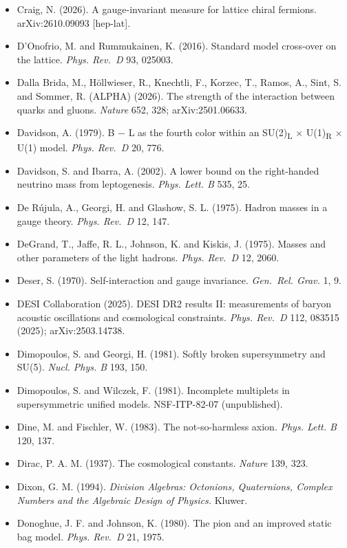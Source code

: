 \documentclass[
  11pt,
]{article}
\begin{document}
\begin{itemize}
\item
  Craig, N. (2026). A gauge-invariant measure for lattice chiral fermions. arXiv:2610.09093 {[}hep-lat{]}.
\item
  D'Onofrio, M. and Rummukainen, K. (2016). Standard model cross-over on the lattice. \emph{Phys. Rev.~D} 93, 025003.
\item
  Dalla Brida, M., Höllwieser, R., Knechtli, F., Korzec, T., Ramos, A., Sint, S. and Sommer, R. (ALPHA) (2026). The strength of the interaction between quarks and gluons. \emph{Nature} 652, 328; arXiv:2501.06633.
\item
  Davidson, A. (1979). B \ensuremath{-} L as the fourth color within an SU(2)\textsubscript{L} \ensuremath{\times} U(1)\textsubscript{R} \ensuremath{\times} U(1) model. \emph{Phys. Rev.~D} 20, 776.
\item
  Davidson, S. and Ibarra, A. (2002). A lower bound on the right-handed neutrino mass from leptogenesis. \emph{Phys. Lett. B} 535, 25.
\item
  De Rújula, A., Georgi, H. and Glashow, S. L. (1975). Hadron masses in a gauge theory. \emph{Phys. Rev.~D} 12, 147.
\item
  DeGrand, T., Jaffe, R. L., Johnson, K. and Kiskis, J. (1975). Masses and other parameters of the light hadrons. \emph{Phys. Rev.~D} 12, 2060.
\item
  Deser, S. (1970). Self-interaction and gauge invariance. \emph{Gen.~Rel. Grav.} 1, 9.
\item
  DESI Collaboration (2025). DESI DR2 results II: measurements of baryon acoustic oscillations and cosmological constraints. \emph{Phys. Rev.~D} 112, 083515 (2025); arXiv:2503.14738.
\item
  Dimopoulos, S. and Georgi, H. (1981). Softly broken supersymmetry and SU(5). \emph{Nucl. Phys. B} 193, 150.
\item
  Dimopoulos, S. and Wilczek, F. (1981). Incomplete multiplets in supersymmetric unified models. NSF-ITP-82-07 (unpublished).
\item
  Dine, M. and Fischler, W. (1983). The not-so-harmless axion. \emph{Phys. Lett. B} 120, 137.
\item
  Dirac, P. A. M. (1937). The cosmological constants. \emph{Nature} 139, 323.
\item
  Dixon, G. M. (1994). \emph{Division Algebras: Octonions, Quaternions, Complex Numbers and the Algebraic Design of Physics.} Kluwer.
\item
  Donoghue, J. F. and Johnson, K. (1980). The pion and an improved static bag model. \emph{Phys. Rev.~D} 21, 1975.

\end{itemize}
\end{document}
